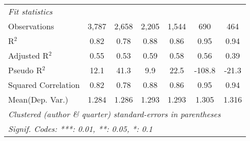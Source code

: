 \begin{tabular}{lcccccc}
   \midrule
   \emph{Fit statistics}\\
   Observations                                               & 3,787   & 2,658         & 2,205         & 1,544         & 690          & 464\\  
   R$^2$                                                      & 0.82    & 0.78          & 0.88          & 0.86          & 0.95         & 0.94\\  
   Adjusted R$^2$                                             & 0.55    & 0.53          & 0.59          & 0.58          & 0.56         & 0.39\\  
   Pseudo R$^2$                                               & 12.1    & 41.3          & 9.9           & 22.5          & -108.8       & -21.3\\  
   Squared Correlation                                        & 0.82    & 0.78          & 0.88          & 0.86          & 0.95         & 0.94\\  
Mean(Dep. Var.) & 1.284 & 1.286 & 1.293 & 1.293 & 1.305 & 1.316 \\
   \midrule \midrule
   \multicolumn{7}{l}{\emph{Clustered (author \& quarter) standard-errors in parentheses}}\\
   \multicolumn{7}{l}{\emph{Signif. Codes: ***: 0.01, **: 0.05, *: 0.1}}\\
\end{tabular}
\par\endgroup
